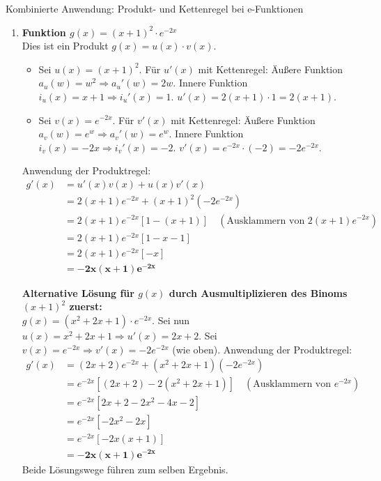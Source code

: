 \begin{loesungsumgebung}{Kombinierte Anwendung: Produkt- und Kettenregel bei e-Funktionen}
\begin{enumerate}[label=(\alph*)]
    \item \textbf{Funktion $g(x) = (x+1)^2 \cdot e^{-2x}$} \\
    Dies ist ein Produkt $g(x) = u(x) \cdot v(x)$.
    \begin{itemize}
        \item Sei $u(x) = (x+1)^2$. Für $u'(x)$ mit Kettenregel:
        Äußere Funktion $a_u(w) = w^2 \Rightarrow a_u'(w) = 2w$.
        Innere Funktion $i_u(x) = x+1 \Rightarrow i_u'(x) = 1$.
        $u'(x) = 2(x+1) \cdot 1 = 2(x+1)$.
        \item Sei $v(x) = e^{-2x}$. Für $v'(x)$ mit Kettenregel:
        Äußere Funktion $a_v(w) = e^w \Rightarrow a_v'(w) = e^w$.
        Innere Funktion $i_v(x) = -2x \Rightarrow i_v'(x) = -2$.
        $v'(x) = e^{-2x} \cdot (-2) = -2e^{-2x}$.
    \end{itemize}
    Anwendung der Produktregel:
    \begin{align*}
    g'(x) &= u'(x)v(x) + u(x)v'(x) \\
          &= 2(x+1)e^{-2x} + (x+1)^2(-2e^{-2x}) \\
          &= 2(x+1)e^{-2x} [1 - (x+1)] \quad (\text{Ausklammern von } 2(x+1)e^{-2x}) \\
          &= 2(x+1)e^{-2x} [1 - x - 1] \\
          &= 2(x+1)e^{-2x} [-x] \\
          &= \mathbf{-2x(x+1)e^{-2x}}
    \end{align*}

    \textbf{Alternative Lösung für $g(x)$ durch Ausmultiplizieren des Binoms $(x+1)^2$ zuerst:} \\
    $g(x) = (x^2+2x+1) \cdot e^{-2x}$.
    Sei nun $u(x) = x^2+2x+1 \Rightarrow u'(x) = 2x+2$.
    Sei $v(x) = e^{-2x} \Rightarrow v'(x) = -2e^{-2x}$ (wie oben).
    Anwendung der Produktregel:
    \begin{align*}
    g'(x) &= (2x+2)e^{-2x} + (x^2+2x+1)(-2e^{-2x}) \\
          &= e^{-2x} [(2x+2) - 2(x^2+2x+1)] \quad (\text{Ausklammern von } e^{-2x}) \\
          &= e^{-2x} [2x+2 - 2x^2-4x-2] \\
          &= e^{-2x} [-2x^2 - 2x] \\
          &= e^{-2x} [-2x(x+1)] \\
          &= \mathbf{-2x(x+1)e^{-2x}}
    \end{align*}
    Beide Lösungswege führen zum selben Ergebnis.
\end{enumerate}

\end{loesungsumgebung}


